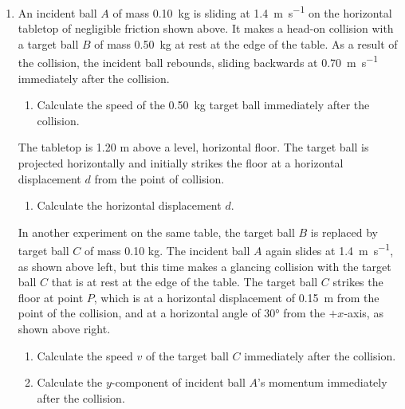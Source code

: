 \documentclass{../../../oss-apphys}
\begin{document}
\begin{enumerate}[leftmargin=15pt]
\begin{enumerate}[nosep]
  \item Suppose that there is a passenger of mass \SI{70}{\kilo\gram} in the
    elevator. Calculate the apparent weight of the passenger at time
    $t=\SI{4}{\second}$.
  \end{enumerate}
  \vspace{1in}
  \newpage
  
  
\item An incident ball $A$ of mass \SI{.10}{\kilo\gram} is sliding at
  \SI{1.4}{\metre\per\second} on the horizontal tabletop of negligible friction
  shown above. It makes a head-on collision with a target ball $B$ of mass
  \SI{.50}{\kilo\gram} at rest at the edge of the table. As a result of the
  collision, the incident ball rebounds, sliding backwards at
  \SI{.70}{\metre\per\second} immediately after the collision.
  \begin{enumerate}[nosep]
  \item Calculate the speed of the \SI{.50}{\kilo\gram} target ball immediately
    after the collision.
  \end{enumerate}
  The tabletop is 1.20 m above a level, horizontal floor. The target ball is
  projected horizontally and initially strikes the floor at a horizontal
  displacement $d$ from the point of collision.
  \begin{enumerate}[nosep]
  \item Calculate the horizontal displacement $d$.
  \end{enumerate}
  \newpage
  
  In another experiment on the same table, the target ball $B$ is replaced by
  target ball $C$ of mass 0.10 kg. The incident ball $A$ again slides at
  \SI{1.4}{\metre\per\second}, as shown above left, but this time makes a
  glancing collision with the target ball $C$ that is at rest at the edge of
  the table. The target ball $C$ strikes the floor at point $P$, which is at a
  horizontal displacement of \SI{.15}{\metre} from the point of the collision,
  and at a horizontal angle of \ang{30} from the $+x$-axis, as shown above
  right.
  \begin{enumerate}[nosep]
  \item Calculate the speed $v$ of the target ball $C$ immediately after the
    collision.
  \item Calculate the $y$-component of incident ball $A$'s momentum immediately
    after the collision.
  \end{enumerate}
  \newpage



\end{enumerate}
\end{document}
